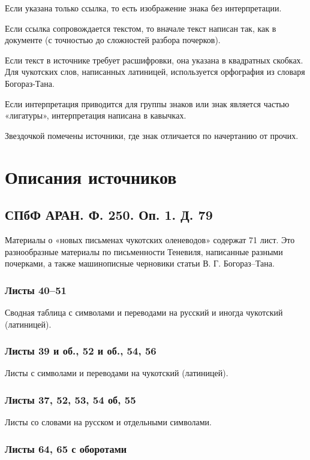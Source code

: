 \documentclass{article}
\begin{document}
Если указана только ссылка, то есть изображение знака без интерпретации.

Если ссылка сопровождается текстом, то вначале текст написан так, как в документе (с точностью до сложностей разбора почерков). 

Если текст в источнике требует расшифровки, она указана в квадратных скобках. Для чукотских слов, написанных латиницей, используется орфография из словаря Богораз-Тана\cite{bogoraz1937}.

Если интерпретация приводится для группы знаков или знак является частью «лигатуры», интерпретация написана в кавычках.

Звездочкой помечены источники, где знак отличается по начертанию от прочих.

\section{Описания источников} 

\subsection{СПбФ АРАН. Ф. 250. Оп. 1. Д. 79}

Материалы о «новых письменах чукотских оленеводов» содержат 71 лист. Это разнообразные материалы по письменности Теневиля, написанные разными почерками, а также машинописные черновики статьи В. Г. Богораз–Тана. 

\subsubsection{Листы 40–51}

Сводная таблица с символами и переводами на русский и иногда чукотский (латиницей).

\subsubsection{Листы 39 и об., 52 и об., 54, 56}

Листы с символами и переводами на чукотский (латиницей).

\subsubsection{Листы 37, 52, 53, 54 об, 55}

Листы со словами на русском и отдельными символами.

\subsubsection{Листы 64, 65 с оборотами}
\end{document}
